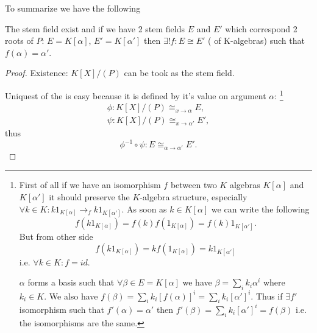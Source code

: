 To summarize we have the following
\begin{proposition}
  The stem field exist and if we have 2 stem fields $E$ and $E'$ which
  correspond 2 roots of $P$: $E = K\left[\alpha\right]$,
  $E' = K\left[\alpha'\right]$ then $\exists! f: E \cong E'$
  ( of K-algebras) such that $f(\alpha) =
  \alpha'$. 
  \begin{proof}
    Existence: $K\left[X\right]/\left(P\right)$ can be took as the
    stem field.

    Uniquest of the  is easy because it is
    defined by it's value on argument $\alpha$:
    \footnote{
      \label{note:stemfieldisomorphismunique}
      First of all if we have an isomorphism $f$ between two $K$
      algebras $K\left[\alpha \right]$ and $K\left[\alpha'
        \right]$ it should preserve the $K$-algebra structure,
      especially $\forall k \in K: k 1_{K\left[\alpha \right]} \to_f
      k 1_{K\left[\alpha' \right]}$. As soon as \(k \in K\left[
        \alpha \right]\) we can write the following
      \[
      f\left(k
      1_{K\left[\alpha \right]}\right) = f\left(k\right)
      f\left(1_{K\left[\alpha \right]}\right) = f\left(k\right)
      1_{K\left[\alpha' \right]}.
      \]
      But from other side
      \[
      f\left(k
      1_{K\left[\alpha \right]}\right) = k f\left(1_{K\left[\alpha
          \right]}\right) = k 1_{K\left[\alpha' \right]}
      \]
      i.e. \(\forall k \in K: f = id\). 

      $\alpha$ forms a basis such that $\forall \beta \in E =
      K\left[\alpha\right]$ we have $\beta = \sum_i k_i \alpha^i$
      where $k_i \in K$. We also have $f\left( \beta \right) =
      \sum_i k_i \left[f \left( \alpha\right)\right]^i = \sum_i k_i
      \left[\alpha'\right]^i$. Thus if $\exists f'$ isomorphism such
      that $f'\left(\alpha \right) = \alpha'$ then $f'\left( \beta
      \right) = \sum_i k_i \left[\alpha'\right]^i =
      f \left( \beta\right)$
      i.e. the isomorphisms are the same. 
    }
    \begin{eqnarray}
      \phi: K\left[X\right]/\left(P\right) \cong_{x \to \alpha} E,
      \nonumber \\
      \psi: K\left[X\right]/\left(P\right) \cong_{x \to \alpha'} E',
      \nonumber
    \end{eqnarray}
    thus
    \[
    \phi^{-1} \circ \psi: E \cong_{\alpha \to \alpha'} E'.
    \]
  \end{proof}
  \label{prop:stemfield}
\end{proposition}


